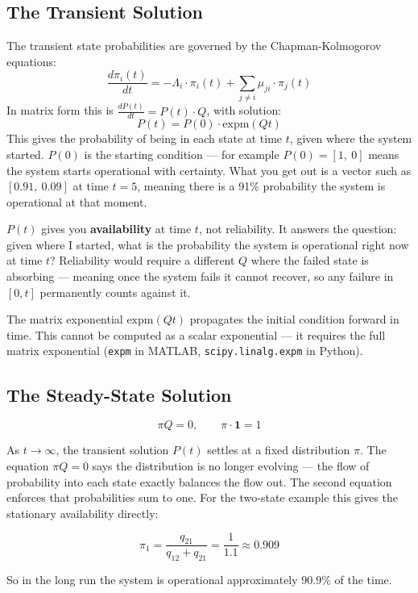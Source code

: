 \subsection*{The Transient Solution}
The transient state probabilities are governed by the 
Chapman-Kolmogorov equations:
\[
    \frac{d\pi_i(t)}{dt} = -\Lambda_i \cdot \pi_i(t) 
    + \sum_{j \neq i} \mu_{ji} \cdot \pi_j(t)
\]
In matrix form this is $\tfrac{dP(t)}{dt} = P(t) \cdot Q$, with solution:
\[
    P(t) = P(0) \cdot \mathrm{expm}(Qt)
\]
This gives the probability of being in each state at time $t$, given 
where the system started. $P(0)$ is the starting condition --- for 
example $P(0) = [1,\ 0]$ means the system starts operational with 
certainty. What you get out is a vector such as $[0.91,\ 0.09]$ at 
time $t = 5$, meaning there is a 91\% probability the system is 
operational at that moment.
\begin{warnbox}
    $P(t)$ gives you \textbf{availability} at time $t$, not reliability. 
    It answers the question: given where I started, what is the probability 
    the system is operational right now at time $t$? Reliability would 
    require a different $Q$ where the failed state is absorbing --- meaning 
    once the system fails it cannot recover, so any failure in $[0, t]$ 
    permanently counts against it.
\end{warnbox}

The matrix exponential $\mathrm{expm}(Qt)$ propagates the initial 
condition forward in time. This cannot be computed as a scalar 
exponential --- it requires the full matrix exponential 
(\texttt{expm} in MATLAB, \texttt{scipy.linalg.expm} in Python).

\subsection*{The Steady-State Solution}

\[
    \pi Q = 0, \qquad \pi \cdot \mathbf{1} = 1
\]

As $t \to \infty$, the transient solution $P(t)$ settles at a fixed 
distribution $\pi$. The equation $\pi Q = 0$ says the distribution 
is no longer evolving --- the flow of probability into each state 
exactly balances the flow out. The second equation enforces that 
probabilities sum to one. For the two-state example this gives the 
stationary availability directly:

\[
    \pi_1 = \frac{q_{21}}{q_{12} + q_{21}} = \frac{1}{1.1} \approx 0.909
\]

So in the long run the system is operational approximately 90.9\% 
of the time.


